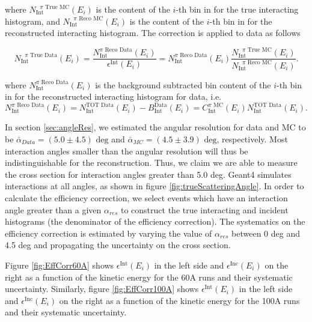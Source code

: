 where $N^{\text{ $\pi$ True MC}}_{\text{Int}} (E_{i}) $ is the content of the $i$-th bin in for the true interacting histogram, and $N^{\text{ $\pi$ Reco MC}}_{\text{Int}} (E_{i}) $ is the content of the $i$-th bin in for the reconstructed interacting histogram. The correction is applied to data as follows

\begin{equation}
N^{\text{ $\pi$ True Data}}_{\text{Int}} (E_{i})  =  \frac{N^{\text{$\pi$ Reco Data}}_{\text{Int}} (E_{i})}{\epsilon^{\text{Int}} (E_{i}) } = N^{\text{$\pi$ Reco Data}}_{\text{Int}} (E_{i}) \frac{N^{\text{ $\pi$ True MC}}_{\text{Int}} (E_{i})}{ N^{\text{ $\pi$ Reco MC}}_{\text{Int}} (E_{i})}.
\end{equation}

where $N^{\text{$\pi$ Reco Data}}_{\text{Int}} (E_{i})$ is the background subtracted bin content of the $i$-th bin in for the reconstructed interacting histogram for data, i.e. 
\begin{equation}
N^{\text{$\pi$ Reco Data}}_{\text{Int}} (E_{i}) =  N^{\text{TOT Data}}_{\text{Int}} (E_{i}) - B^{\text{Data}}_{\text{Int}} (E_i)  =  C^{\text{$\pi$ MC}}_{\text{Int}} (E_{i}) N^{\text{TOT Data}}_{\text{Int}} (E_{i}).
\end{equation}


In section \ref{sec:angleRes}, we estimated the angular resolution for data and MC to be $\bar\alpha_{Data} = (5.0 \pm 4.5) \text{ deg}$  and 
$\bar\alpha_{MC} = (4.5 \pm 3.9) \text{ deg}$, respectively.  Most interaction angles smaller than the angular resolution will thus be indistinguishable  for the reconstruction. Thus, we claim we are able to  measure the cross section for interaction angles greater than 5.0 deg. Geant4 simulates interactions at all angles, as shown in figure \ref{fig:trueScatteringAngle}. In order to calculate the efficiency correction,  we select events which have an interaction angle greater than a given $\alpha_{res}$ to construct the true interacting and incident histograms (the denominator of the efficiency correction). The systematics on the efficiency correction is estimated by varying the value of $\alpha_{res}$ between 0 deg and 4.5 deg and propagating the uncertainty on the cross section. 


Figure \ref{fig:EffCorr60A} shows $\epsilon^{\text{Int}}(E_{i})$ in the left side and $ \epsilon^{\text{Inc}}(E_i)$ on the right as a function of the kinetic energy for the 60A runs and their systematic uncertainty. Similarly, figure \ref{fig:EffCorr100A} shows $\epsilon^{\text{Int}}(E_{i})$ in the left side and $ \epsilon^{\text{Inc}}(E_i)$ on the right as a function of the kinetic energy for the 100A runs and their systematic uncertainty. 

